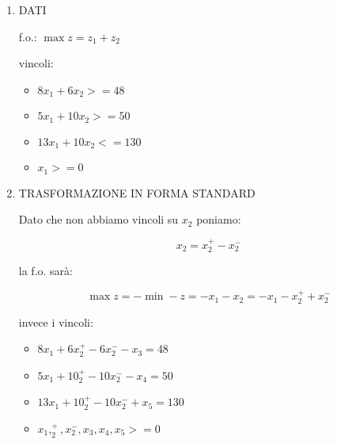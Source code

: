 \begin{enumerate}
	\item DATI
	
		f.o.: $\max z = z_1 + z_2$

		vincoli:

		\begin{itemize}
			\item $8x_1 + 6x_2 >= 48$
			\item $5x_1 + 10x_2 >= 50$
			\item $13x_1 + 10x_2 <= 130$
			\item $x_1 >= 0$
		\end{itemize}
		
	\item TRASFORMAZIONE IN FORMA STANDARD
	
		Dato che non abbiamo vincoli su $x_2$ poniamo:
		
		$$x_2 = x_2^+ - x_2^-$$
		
		la f.o. sarà:
		
		$$\max z = -\min -z = -x_1 -x_2 = -x_1 -x_2^+ + x_2^-$$
		
		invece i vincoli:
		
		\begin{itemize}
			\item $8x_1 + 6x_2^+ - 6x_2^- - x_3 = 48$
			\item $5x_1 + 10_2^+ - 10x_2^- - x_4 = 50$
			\item $13x_1 + 10_2^+ - 10x_2^- + x_5 = 130$
			\item $x_1, _2^+, x_2^-, x_3, x_4, x_5 >= 0$
		\end{itemize}
	
\end{enumerate}

